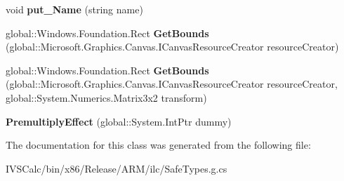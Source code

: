 \begin{DoxyCompactItemize}
\mbox{\label{class_microsoft_1_1_graphics_1_1_canvas_1_1_effects_1_1_premultiply_effect_ae2c6e17d6ad14c7d19658f450781811a}} 
void {\bfseries put\+\_\+\+Name} (string name)
\item 
\mbox{\label{class_microsoft_1_1_graphics_1_1_canvas_1_1_effects_1_1_premultiply_effect_a47fdc5928f2f49a98c50255a72422ff2}} 
global\+::\+Windows.\+Foundation.\+Rect {\bfseries Get\+Bounds} (global\+::\+Microsoft.\+Graphics.\+Canvas.\+I\+Canvas\+Resource\+Creator resource\+Creator)
\item 
\mbox{\label{class_microsoft_1_1_graphics_1_1_canvas_1_1_effects_1_1_premultiply_effect_a947b24f370b9b36c3b160ab2faa72fcd}} 
global\+::\+Windows.\+Foundation.\+Rect {\bfseries Get\+Bounds} (global\+::\+Microsoft.\+Graphics.\+Canvas.\+I\+Canvas\+Resource\+Creator resource\+Creator, global\+::\+System.\+Numerics.\+Matrix3x2 transform)
\item 
\mbox{\label{class_microsoft_1_1_graphics_1_1_canvas_1_1_effects_1_1_premultiply_effect_a8186cf7bd26fe373a3ab0216db4f0f3a}} 
{\bfseries Premultiply\+Effect} (global\+::\+System.\+Int\+Ptr dummy)
\end{DoxyCompactItemize}


The documentation for this class was generated from the following file\+:\begin{DoxyCompactItemize}
\item 
I\+V\+S\+Calc/bin/x86/\+Release/\+A\+R\+M/ilc/Safe\+Types.\+g.\+cs\end{DoxyCompactItemize}
